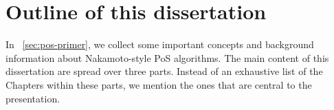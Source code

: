 






\section{Outline of this dissertation}
In \Section~\ref{sec:pos-primer}, 
we collect some important concepts and background information about Nakamoto-style PoS algorithms. 
The main content of this dissertation are spread over three parts. 
Instead of an exhaustive list of the Chapters within these parts, 
we mention the ones that are central to the presentation.

